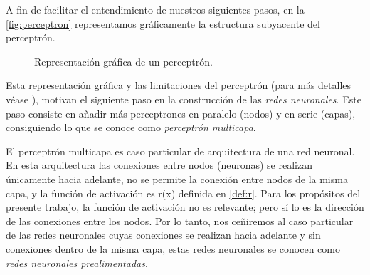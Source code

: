 \documentclass[12pt, a4paper, twoside]{book}
\numberwithin{equation}{section}
\theoremstyle{definition}
\theoremstyle{remark}
\theoremstyle{plain}
\begin{document}
	A fin de facilitar el entendimiento de nuestros siguientes pasos, 
	en la \autoref{fig:perceptron} representamos gráficamente la 
	estructura subyacente del perceptrón.
	\begin{figure}[!htbp]
		\centering
		\caption{Representación gráfica de un perceptrón.}
		\label{fig:perceptron}
	\end{figure}
	
	
	
	Esta representación gráfica y las limitaciones del perceptrón (para 
	más detalles véase \cite{Perceptron-Convergencia}), motivan el 
	siguiente paso en la 
	construcción de las \emph{redes neuronales}. Este paso consiste en 
	añadir más perceptrones en paralelo (nodos) y en serie (capas), 
	consiguiendo lo que se conoce como \emph{perceptrón multicapa}.

	El perceptrón multicapa es caso particular de arquitectura de una red 
	neuronal. En esta arquitectura las conexiones entre nodos (neuronas) 
	se realizan únicamente hacia adelante, no se permite la conexión 
	entre nodos de la misma capa, y la función de activación es 
	r(x) definida en \ref{def:r}. Para los propósitos del presente 
	trabajo, la función de activación no es relevante; pero sí lo es la 
	dirección de las conexiones entre los nodos. Por lo tanto, nos 
	ceñiremos al caso particular de las redes neuronales cuyas conexiones
	se realizan hacia adelante y sin conexiones dentro de la misma capa, 
	estas redes neuronales se conocen como \emph{redes neuronales 
	prealimentadas}. 
	
\end{document}
